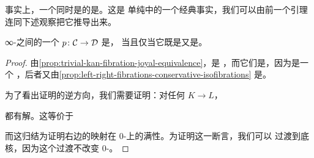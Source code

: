 \begin{remark}\label{rem:kan-fibration-we-trivial-fibration}
事实上，一个同时是\trWeakEquivalence{}的\trKanFibration{}是\trTrivialFibration{}。这是
单纯\trHomotopyTheory{}中的一个经典事实，我们可以由前一个引理连同下述观察把它推导出来。
\end{remark}

\begin{lemma}\label{lem:trivial-fibration-joyal-isofibration}
∞-\trCategories{}之间的一个\trFunctor{} $p\colon \mathcal{C} \to \mathcal{D}$ 是\trTrivialFibration{}，
当且仅当它既是\trJoyalEquivalence{}又是\trIsofibration{}。
\end{lemma}

\begin{proof}
由\cref{prop:trivial-kan-fibration-joyal-equivalence}，\trTrivialFibration{}是%
\trJoyalEquivalence{}，而它们是\trIsofibration{}，因为\trTrivialFibration{}是一个%
\trLeftFibration{}，后者又由\cref{prop:left-right-fibrations-conservative-isofibrations}
是\trConservative{}\trIsofibration{}。

为了看出证明的逆方向，我们需要证明：对任何\trMonomorphism{} $K \to L$，
\trLiftingProblem{}%
\begin{center}
\end{center}
都有解。这等价于\trLiftingProblem{}%
\begin{center}
\end{center}
而这归结为证明右边的映射在 $0$-\trSimplex{}上的满性。为证明这一断言，我们可以
过渡到底\trGroupoid{}核，因为这个过渡不改变 $0$-\trSimplex{}。


\end{proof}
